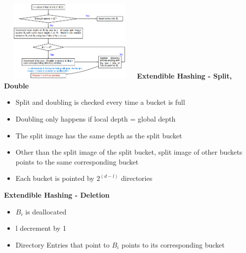 \documentclass[10pt, landscape]{article}
\begin{document}
\begin{multicols}{4}
\includegraphics[width=7cm, height=4cm]{extendible_hash.png}
\textbf{Extendible Hashing - Split, Double}
\begin{itemize}
  \item Split and doubling is checked every time a bucket is full 
  \item Doubling only happens if local depth = global depth
  \item The split image has the same depth as the split bucket
  \item Other than the split image of the split bucket, split image of other buckets points to the same corresponding bucket
  \item Each bucket is pointed by $2^(d-l)$ directories
\end{itemize}

\textbf{Extendible Hashing - Deletion}
\begin{itemize}
  \item $B_i$ is deallocated
  \item l decrement by 1
  \item Directory Entries that point to $B_i$ points to its corresponding bucket
\end{itemize}


\end{multicols}
\end{document}

